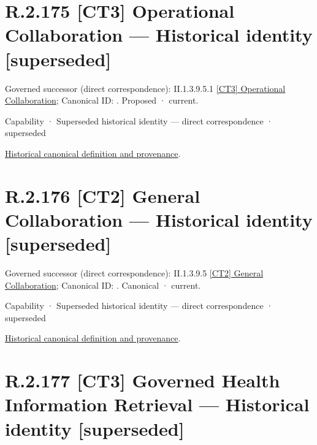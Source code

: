 \section*{R.2.175 [CT3] Operational Collaboration — Historical identity [superseded]}
\label{navigation:R.2.175}

{\small Governed successor (direct correspondence): II.1.3.9.5.1 \hyperref[element:631fdb8b47084008ac9b5de28b26972b]{[CT3] Operational Collaboration}; Canonical ID: \texttt{}. Proposed · current.}\par
\label{element:99e9d9763ec94140b7d7642f4b5966f6}
{\small Capability · Superseded historical identity — direct correspondence · superseded}\par
\href{../../../../continuum/strategy/capability/99e9d9763ec94140b7d7642f4b5966f6.md}{Historical canonical definition and provenance}.\par
\section*{R.2.176 [CT2] General Collaboration — Historical identity [superseded]}
\label{navigation:R.2.176}

{\small Governed successor (direct correspondence): II.1.3.9.5 \hyperref[element:3bb740e6db284112b054905c0c6c80be]{[CT2] General Collaboration}; Canonical ID: \texttt{}. Canonical · current.}\par
\label{element:4f58c82aca7a4b54aeb6e2920ce5c12a}
{\small Capability · Superseded historical identity — direct correspondence · superseded}\par
\href{../../../../continuum/strategy/capability/4f58c82aca7a4b54aeb6e2920ce5c12a.md}{Historical canonical definition and provenance}.\par
\section*{R.2.177 [CT3] Governed Health Information Retrieval — Historical identity [superseded]}
\label{navigation:R.2.177}

